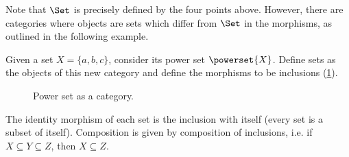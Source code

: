 Note that $\Set$ is precisely defined by the four points above. However, there are categories where objects are sets which differ from $\Set$ in the morphisms, as outlined in the following example.
\begin{example}
\label{ex:hasseinclusion}
Given a set $X=\{a,b,c\}$, consider its power set $\powerset{X}$. Define sets as the objects of this new category and define the morphisms to be inclusions (\cref{fig:powersetcat}).
\begin{figure}[h!]
\begin{center}
\end{center}
\caption{Power set as a category. \label{fig:powersetcat}}
\end{figure}
The identity morphism of each set is the inclusion with itself (every set is a subset of itself). Composition is given by composition of inclusions, i.e. if $X\subseteq Y \subseteq Z$, then $X\subseteq Z$.
\end{example}